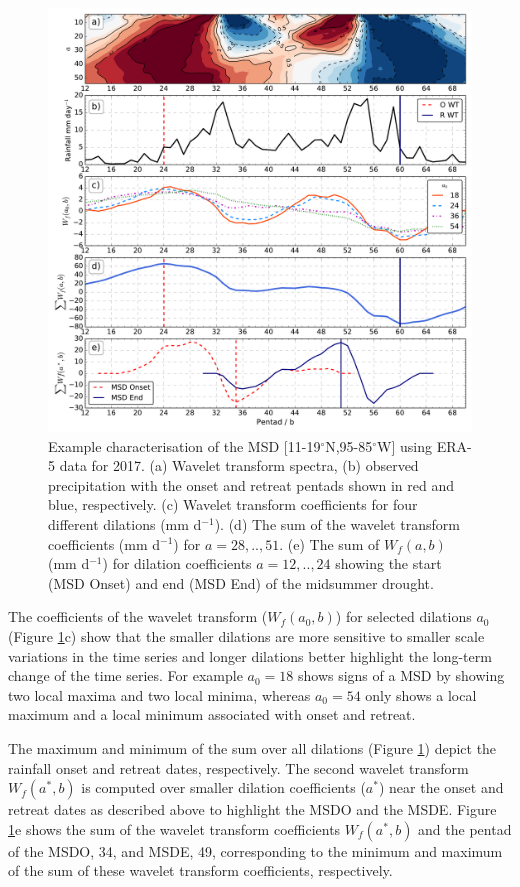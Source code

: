 \begin{figure}[t!]
\centering
 \includegraphics[width=\linewidth]{figures/wav_fig4.pdf}
\caption[Wavelet transform characterisation of Midsummer drought]{ Example characterisation of the MSD [11-19$^\circ$N,95-85$^\circ$W] using ERA-5 data for 2017. (a) Wavelet transform spectra, (b) observed precipitation with the onset and retreat pentads shown in red and blue, respectively. (c) Wavelet transform coefficients for four different dilations (mm d$^{-1}$). (d) The sum of the wavelet transform coefficients (mm d$^{-1}$) for $a={28,..,51}$. (e) The sum of $W_f(a,b)$ (mm d$^{-1}$) for dilation coefficients $a={12,..,24}$ showing the start (MSD Onset) and end (MSD End) of the midsummer drought. }
\label{fig:5}
\end{figure}

The coefficients of the wavelet transform ($W_f(a_0,b)$) for selected dilations $a_0$  (Figure \ref{fig:5}c) show that the smaller dilations are more sensitive to smaller scale variations in the time series and longer dilations better highlight the long-term change of the time series. For example $a_0=18$ shows signs of a MSD by showing two local maxima and two local minima, whereas $a_0=54$ only shows a local maximum and a local minimum associated with onset and retreat.

The maximum and minimum of the sum over all dilations (Figure \ref{fig:5}) depict the rainfall onset and retreat dates, respectively. The second wavelet transform $W_f(a^*,b)$ is computed over smaller dilation coefficients ($a^*$) near the onset and retreat dates as described above to highlight the MSDO and the MSDE.
Figure \ref{fig:5}e shows the sum of the wavelet transform coefficients  $W_f(a^*,b)$ and the pentad of the MSDO, 34, and MSDE, 49, corresponding to the minimum and maximum of the sum of these wavelet transform coefficients, respectively.

